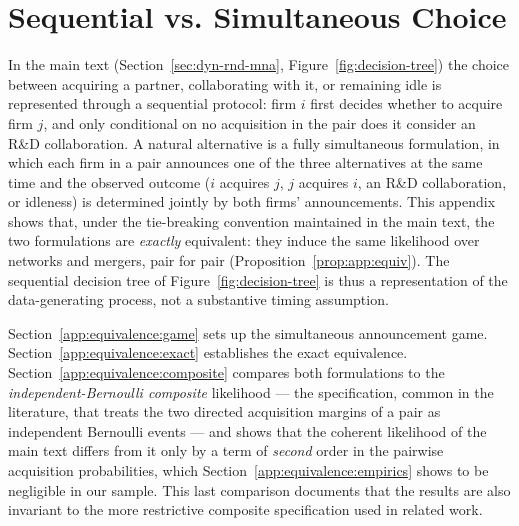 
\FloatBarrier

\section{Sequential vs. Simultaneous Choice}
\label{app:equivalence}
In the main text (Section~\ref{sec:dyn-rnd-mna},
Figure~\ref{fig:decision-tree}) the choice between acquiring a partner,
collaborating with it, or remaining idle is represented through a
sequential protocol: firm $i$ first decides whether to acquire firm $j$,
and only conditional on no acquisition in the pair does it consider an
R\&D collaboration. A natural alternative is a fully simultaneous
formulation, in which each firm in a pair announces one of the three
alternatives at the same time and the observed outcome ($i$ acquires
$j$, $j$ acquires $i$, an R\&D collaboration, or idleness) is determined
jointly by both firms' announcements. This appendix shows that, under
the tie-breaking convention maintained in the main text, the two
formulations are \emph{exactly} equivalent: they induce the same
likelihood over networks and mergers, pair for pair
(Proposition~\ref{prop:app:equiv}). The sequential decision tree of
Figure~\ref{fig:decision-tree} is thus a representation of the
data-generating process, not a substantive timing assumption.

Section~\ref{app:equivalence:game} sets up the simultaneous announcement
game. Section~\ref{app:equivalence:exact} establishes the exact
equivalence. Section~\ref{app:equivalence:composite} compares both
formulations to the \emph{independent-Bernoulli composite} likelihood
--- the specification, common in the literature, that treats the two
directed acquisition margins of a pair as independent Bernoulli events
--- and shows that the coherent likelihood of the main text differs
from it only by a term of \emph{second} order in the pairwise
acquisition probabilities, which Section~\ref{app:equivalence:empirics}
shows to be negligible in our sample. This last comparison documents
that the results are also invariant to the more restrictive composite
specification used in related work.

